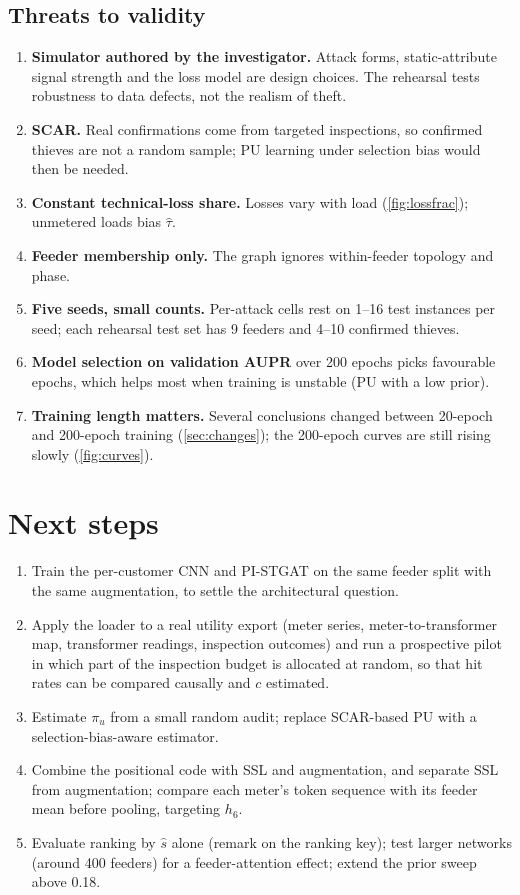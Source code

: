 \documentclass[11pt,a4paper]{article}
\theoremstyle{plain}
\theoremstyle{definition}
\theoremstyle{remark}
\begin{document}
\subsection{Threats to validity}
\label{sec:threats}
\begin{enumerate}
\item \textbf{Simulator authored by the investigator.} Attack forms, static-attribute signal strength and the loss model are design choices. The rehearsal tests robustness to data defects, not the realism of theft.
\item \textbf{SCAR.} Real confirmations come from targeted inspections, so confirmed thieves are not a random sample; PU learning under selection bias \citep{bekker2020} would then be needed.
\item \textbf{Constant technical-loss share.} Losses vary with load (\cref{fig:lossfrac}); unmetered loads bias $\hat\tau$.
\item \textbf{Feeder membership only.} The graph ignores within-feeder topology and phase.
\item \textbf{Five seeds, small counts.} Per-attack cells rest on 1--16 test instances per seed; each rehearsal test set has 9 feeders and 4--10 confirmed thieves.
\item \textbf{Model selection on validation AUPR} over 200 epochs picks favourable epochs, which helps most when training is unstable (PU with a low prior).
\item \textbf{Training length matters.} Several conclusions changed between 20-epoch and 200-epoch training (\cref{sec:changes}); the 200-epoch curves are still rising slowly (\cref{fig:curves}).
\end{enumerate}

\section{Next steps}
\label{sec:next}
\begin{enumerate}
\item Train the per-customer CNN and PI-STGAT on the same feeder split with the same augmentation, to settle the architectural question.
\item Apply the loader to a real utility export (meter series, meter-to-transformer map, transformer readings, inspection outcomes) and run a prospective pilot in which part of the inspection budget is allocated at random, so that hit rates can be compared causally and $c$ estimated.
\item Estimate $\pi_u$ from a small random audit; replace SCAR-based PU with a selection-bias-aware estimator.
\item Combine the positional code with SSL and augmentation, and separate SSL from augmentation; compare each meter's token sequence with its feeder mean before pooling, targeting $h_6$.
\item Evaluate ranking by $\hat s$ alone (remark on the ranking key); test larger networks (around 400 feeders) for a feeder-attention effect; extend the prior sweep above 0.18.
\end{enumerate}
\end{document}
